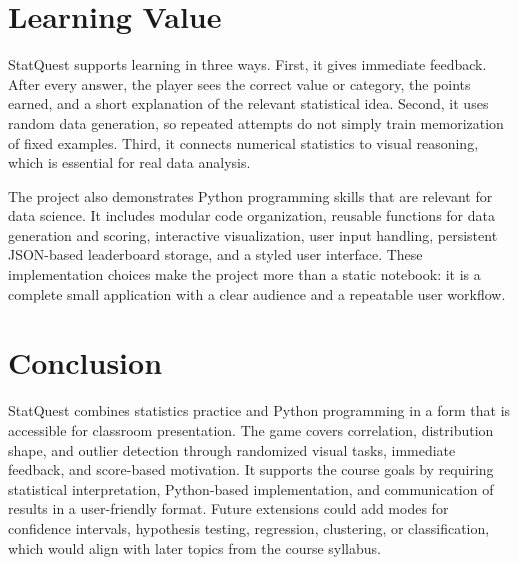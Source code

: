 \documentclass[conference]{IEEEtran}
\begin{document}
\section{Learning Value}
StatQuest supports learning in three ways. First, it gives immediate feedback. After every answer, the player sees the correct value or category, the points earned, and a short explanation of the relevant statistical idea. Second, it uses random data generation, so repeated attempts do not simply train memorization of fixed examples. Third, it connects numerical statistics to visual reasoning, which is essential for real data analysis.

The project also demonstrates Python programming skills that are relevant for data science. It includes modular code organization, reusable functions for data generation and scoring, interactive visualization, user input handling, persistent JSON-based leaderboard storage, and a styled user interface. These implementation choices make the project more than a static notebook: it is a complete small application with a clear audience and a repeatable user workflow.

\section{Conclusion}
StatQuest combines statistics practice and Python programming in a form that is accessible for classroom presentation. The game covers correlation, distribution shape, and outlier detection through randomized visual tasks, immediate feedback, and score-based motivation. It supports the course goals by requiring statistical interpretation, Python-based implementation, and communication of results in a user-friendly format. Future extensions could add modes for confidence intervals, hypothesis testing, regression, clustering, or classification, which would align with later topics from the course syllabus.
\end{document}
